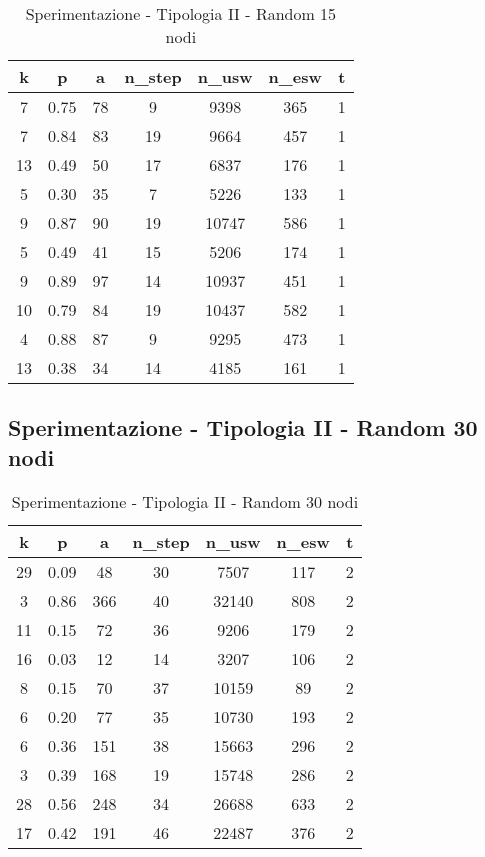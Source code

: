 \begin{table}[H]
\centering
\begin{tabular}{|c|c|c|c|c|c|c|}
\hline
\textbf{k} & \textbf{p} & \textbf{a} & \textbf{n\_step} & \textbf{n\_usw} & \textbf{n\_esw} & \textbf{t} \\ \hline
7 & 0.75 & 78 & 9 & 9398 & 365 & 1 \\ \hline
7 & 0.84 & 83 & 19 & 9664 & 457 & 1 \\ \hline
13 & 0.49 & 50 & 17 & 6837 & 176 & 1 \\ \hline
5 & 0.30 & 35 & 7 & 5226 & 133 & 1 \\ \hline
9 & 0.87 & 90 & 19 & 10747 & 586 & 1 \\ \hline
5 & 0.49 & 41 & 15 & 5206 & 174 & 1 \\ \hline
9 & 0.89 & 97 & 14 & 10937 & 451 & 1 \\ \hline
10 & 0.79 & 84 & 19 & 10437 & 582 & 1 \\ \hline
4 & 0.88 & 87 & 9 & 9295 & 473 & 1 \\ \hline
13 & 0.38 & 34 & 14 & 4185 & 161 & 1 \\ \hline
\end{tabular}
\caption{Sperimentazione - Tipologia II - Random 15 nodi}
\label{tab:sperimentazione-tipo1-15nodi}
\end{table}

\subsection{Sperimentazione - Tipologia II - Random 30 nodi}

\begin{table}[H]
\centering
\begin{tabular}{|c|c|c|c|c|c|c|}
\hline
\textbf{k} & \textbf{p} & \textbf{a} & \textbf{n\_step} & \textbf{n\_usw} & \textbf{n\_esw} & \textbf{t} \\ \hline
29 & 0.09 & 48 & 30 & 7507 & 117 & 2 \\ \hline
3 & 0.86 & 366 & 40 & 32140 & 808 & 2 \\ \hline
11 & 0.15 & 72 & 36 & 9206 & 179 & 2 \\ \hline
16 & 0.03 & 12 & 14 & 3207 & 106 & 2 \\ \hline
8 & 0.15 & 70 & 37 & 10159 & 89 & 2 \\ \hline
6 & 0.20 & 77 & 35 & 10730 & 193 & 2 \\ \hline
6 & 0.36 & 151 & 38 & 15663 & 296 & 2 \\ \hline
3 & 0.39 & 168 & 19 & 15748 & 286 & 2 \\ \hline
28 & 0.56 & 248 & 34 & 26688 & 633 & 2 \\ \hline
17 & 0.42 & 191 & 46 & 22487 & 376 & 2 \\ \hline
\end{tabular}
\caption{Sperimentazione - Tipologia II - Random 30 nodi}
\label{tab:sperimentazione-tipo1-30nodi}
\end{table}

